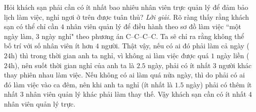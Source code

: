 \begin{multicols}{2}
	\vskip 0.1cm
	Hỏi khách sạn phải cần có ít nhất bao nhiêu nhân viên trực quản lý để đảm bảo lịch làm việc, nghỉ ngơi ở trên được tuân thủ?
	\vskip 0.1cm
	\textit{Lời giải.} Rõ ràng thấy rằng khách sạn có thể chỉ cần $4$ nhân viên quản lý để điều hành theo sơ đồ làm việc ``một ngày làm, $3$ ngày nghỉ" theo phương án C--C--C--C.
	\vskip 0.1cm
	Ta sẽ chỉ ra rằng không thể bố trí với số nhân viên ít hơn $4$ người. Thật vậy, nếu có ai đó phải làm cả ngày ($24$h) thì trong thời gian anh ta nghỉ, vì không ai làm việc được quá $1$ ngày liền ($24$h), nên suốt thời gian nghỉ của anh ta là $2{.}5$ ngày, phải có ít nhất $3$ người khác thay phiên nhau làm việc.
	\vskip 0.1cm
	Nếu không có ai làm quá nửa ngày, thì do phải có ai đó làm việc vào ca đêm, nên khi anh ta nghỉ (ít nhất là $1{.}5$ ngày) phải có thêm ít nhất $3$ nhân viên quản lý khác phải làm thay thế.
	\vskip 0.1cm
	Vậy khách sạn cần có ít nhất $4$ nhân viên quản lý trực.
\end{multicols}
%
